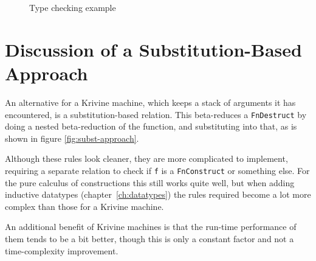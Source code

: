 \begin{figure}[h]
	\caption{Type checking example}
	\label{fig:type-check-example}
\end{figure}

\section{Discussion of a Substitution-Based Approach}
\label{sec:coc-subst}

An alternative for a Krivine machine, which keeps a stack of arguments it has encountered, is a substitution-based relation. This beta-reduces a \verb|FnDestruct| by doing a nested beta-reduction of the function, and substituting into that, as is shown in figure \ref{fig:subst-approach}.

Although these rules look cleaner, they are more complicated to implement, requiring a separate relation to check if \verb|f| is a \verb|FnConstruct| or something else. For the pure calculus of constructions this still works quite well, but when adding inductive datatypes (chapter~\ref{ch:datatypes}) the rules required become a lot more complex than those for a Krivine machine.

An additional benefit of Krivine machines is that the run-time performance of them tends to be a bit better, though this is only a constant factor and not a time-complexity improvement.

